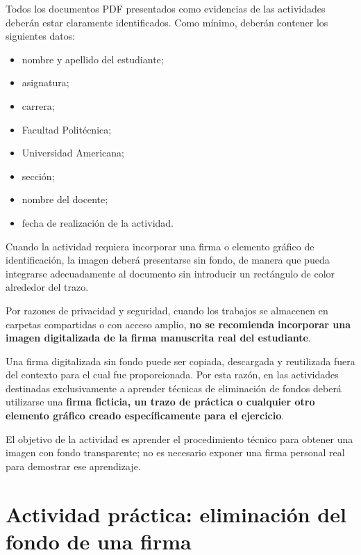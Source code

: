 \documentclass[12pt,a4paper]{article}
\begin{document}
Todos los documentos PDF presentados como evidencias de las actividades deberán estar claramente identificados. Como mínimo, deberán contener los siguientes datos:

\begin{itemize}
    \item nombre y apellido del estudiante;
    \item asignatura;
    \item carrera;
    \item Facultad Politécnica;
    \item Universidad Americana;
    \item sección;
    \item nombre del docente;
    \item fecha de realización de la actividad.
\end{itemize}

Cuando la actividad requiera incorporar una firma o elemento gráfico de identificación, la imagen deberá presentarse sin fondo, de manera que pueda integrarse adecuadamente al documento sin introducir un rectángulo de color alrededor del trazo.

\begin{tcolorbox}[
colback=yellow!5,
colframe=black,
title=\textbf{Importante: protección de la firma manuscrita},
sharp corners,
boxrule=0.8pt,
width=\textwidth
]
Por razones de privacidad y seguridad, cuando los trabajos se almacenen en carpetas compartidas o con acceso amplio, \textbf{no se recomienda incorporar una imagen digitalizada de la firma manuscrita real del estudiante}.

Una firma digitalizada sin fondo puede ser copiada, descargada y reutilizada fuera del contexto para el cual fue proporcionada. Por esta razón, en las actividades destinadas exclusivamente a aprender técnicas de eliminación de fondos deberá utilizarse una \textbf{firma ficticia, un trazo de práctica o cualquier otro elemento gráfico creado específicamente para el ejercicio}.

El objetivo de la actividad es aprender el procedimiento técnico para obtener una imagen con fondo transparente; no es necesario exponer una firma personal real para demostrar ese aprendizaje.
\end{tcolorbox}

\section{Actividad práctica: eliminación del fondo de una firma}
\end{document}
